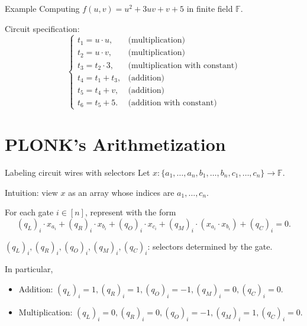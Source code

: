 \documentclass{beamer}
\begin{document}
	\begin{frame}{Example}
		Computing $f(u, v) = u^2 + 3uv + v + 5$ in finite field $\mathbb{F}$. 
		
		 Circuit specification:
		 \begin{equation*}
		 	\begin{cases}
		 		t_1 = u \cdot u,&\text{(multiplication)}\\
		 		t_2 = u \cdot v,&\text{(multiplication)}\\
		 		t_3 = t_2 \cdot 3,&\text{(multiplication with constant)}\\
		 		t_4 = t_1 + t_3,&\text{(addition)}\\
		 		t_5 = t_4 + v,&\text{(addition)}\\
		 		t_6 = t_5 + 5.&\text{(addition with constant)}
		 	\end{cases}
		 \end{equation*}
	\end{frame}

	\section{PLONK's Arithmetization}
	\begin{frame}{Labeling circuit wires with selectors}
		Let $x : \{a_1, \dots, a_n, b_1, \dots, b_n, c_1, \dots, c_n\} \rightarrow \mathbb{F}$.
		
		Intuition: view $x$ as an array whose indices are $a_1, \dots, c_n$.
		
		For each gate $i \in [n]$, represent with the form
		\begin{equation*}
			(q_L)_i \cdot x_{a_i} + (q_R)_i \cdot x_{b_i} + (q_O)_i \cdot x_{c_i} + (q_M)_i \cdot (x_{a_i} \cdot x_{b_i}) + (q_C)_i = 0.
		\end{equation*}
		
		$(q_L)_i, (q_R)_i, (q_O)_i, (q_M)_i, (q_C)_i$: selectors determined by the gate.
		
		In particular,
		\begin{itemize}
			\item Addition: $(q_L)_i = 1, (q_R)_i = 1, (q_O)_i = -1, (q_M)_i = 0, (q_C)_i = 0$.
			\item Multiplication: $(q_L)_i = 0, (q_R)_i = 0, (q_O)_i = -1, (q_M)_i = 1, (q_C)_i = 0$.
		\end{itemize}
	\end{frame}
\end{document}
